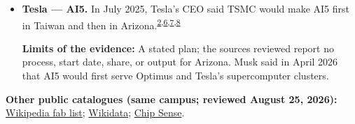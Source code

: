 \begin{minipage}[t][0.90\textheight][t]{\textwidth}
\begin{itemize}[leftmargin=1.25em,itemsep=0.35em,topsep=0.15em,parsep=0pt]
\item {\footnotesize\textbf{Tesla --- AI5.} In July 2025, Tesla's CEO said TSMC would make AI5 first in Taiwan and then in Arizona.\nobreak\textsuperscript{\href{\detokenize{https://www.tsmc.com/static/abouttsmcaz/index.htm}}{\textcolor{accent}{2}},\href{\detokenize{https://www.kedglobal.com/korean-chipmakers/newsView/ked202507280001}}{\textcolor{accent}{6}},\href{\detokenize{https://www.cnbc.com/2025/10/22/elon-musk-tesla-ai5-nvidia.html}}{\textcolor{accent}{7}},\href{\detokenize{https://www.notateslaapp.com/news/3974/musk-says-teslas-ai5-chip-is-done-not-coming-to-vehicles-first}}{\textcolor{accent}{8}}}\par {\scriptsize\color{black!62}\textbf{Limits of the evidence:} A stated plan; the sources reviewed report no process, start date, share, or output for Arizona. Musk said in April 2026 that AI5 would first serve Optimus and Tesla's supercomputer clusters.\par}}
\end{itemize}
\smallskip
{\sffamily\scriptsize\color{black!62}\textbf{Other public catalogues (same campus; reviewed August 25, 2026):} \href{\detokenize{https://en.wikipedia.org/w/index.php?title=List_of_semiconductor_fabrication_plants&oldid=1370451124}\#\detokenize{Open_plants}}{Wikipedia fab list}; \href{\detokenize{https://www.wikidata.org/w/index.php?title=Q135913497&oldid=2485030743}}{Wikidata}; \href{\detokenize{https://github.com/aminalav/chip-sense/blob/93d22afe9e1309a7bebd6c7c96541f069f1d67ac/src/data/fab-sites.json}\#\detokenize{L13-L20}}{Chip Sense}.\par}
\medskip

\end{minipage}

